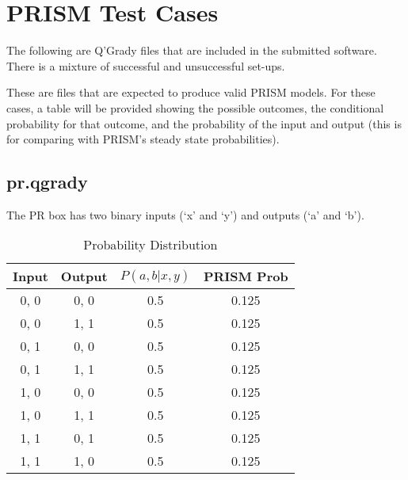 \documentclass[report.tex]{subfiles}
\begin{document}

\section{PRISM Test Cases} %
\label{sec:prism_test_cases}
The following are Q'Grady files that are included in the submitted software.
There is a mixture of successful and unsuccessful set-ups.

These are files that are expected to produce valid PRISM models. For these
cases, a table will be provided showing the possible outcomes, the conditional
probability for that outcome, and the probability of the input and output (this
is for comparing with PRISM's steady state probabilities).

\subsection{pr.qgrady} %
\label{sub:pr_qgrady}
The PR box has two binary inputs (`x' and `y') and outputs (`a' and `b').
\begin{table}[H]
  \centering
  \begin{tabular}{c | c | c | c}
    Input & Output & \(P(a, b | x, y)\) & PRISM Prob \\
    \hline
    0, 0 & 0, 0 & 0.5 & 0.125 \\
    0, 0 & 1, 1 & 0.5 & 0.125 \\
    0, 1 & 0, 0 & 0.5 & 0.125 \\
    0, 1 & 1, 1 & 0.5 & 0.125 \\
    1, 0 & 0, 0 & 0.5 & 0.125 \\
    1, 0 & 1, 1 & 0.5 & 0.125 \\
    1, 1 & 0, 1 & 0.5 & 0.125 \\
    1, 1 & 1, 0 & 0.5 & 0.125 \\
  \end{tabular}
  \caption{Probability Distribution}
  \label{tab:pr_qgrady}
\end{table}
\end{document}
